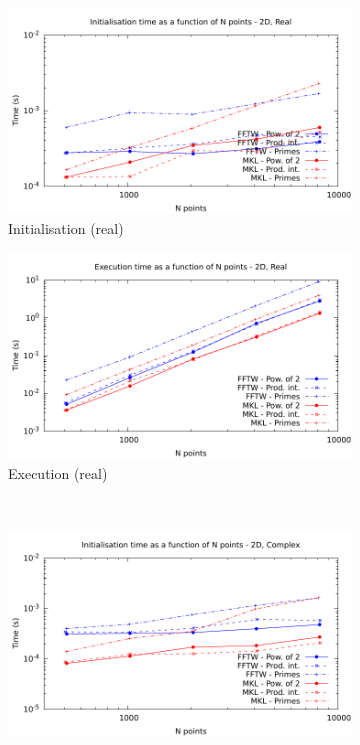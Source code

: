 \documentclass[12pt, a4paper]{article} \setlength{\textheight}{24cm}
\begin{document}
\begin{figure}[H]
  \captionsetup{width=0.8\linewidth}
  \centering
  \begin{subfigure}{.5\textwidth}
    \centering
    \includegraphics[width=.9\linewidth]{graphs/2d-init-r.pdf}
    \caption{Initialisation (real)}
    \label{2DRI}
  \end{subfigure}%
  \begin{subfigure}{.5\textwidth}
    \centering
    \includegraphics[width=.9\linewidth]{graphs/2d-exec-r.pdf}
    \caption{Execution (real)}
    \label{2DR}
  \end{subfigure}\\
  \begin{subfigure}{.5\textwidth}
    \centering
    \includegraphics[width=.9\linewidth]{graphs/2d-init-c.pdf}

\end{subfigure}
\end{figure}
\end{document}
